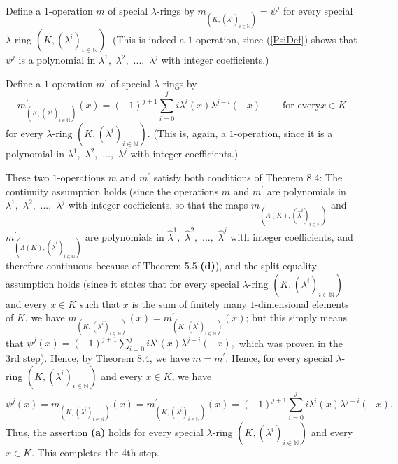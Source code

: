 \documentclass[numbers=enddot,12pt,final,onecolumn,notitlepage]{scrartcl}%
\begin{document}
Define a $1$-operation $m$ of special $\lambda$-rings by $m_{\left(  K,\left(
\lambda^{i}\right)  _{i\in\mathbb{N}}\right)  }=\psi^{j}$ for every special
$\lambda$-ring $\left(  K,\left(  \lambda^{i}\right)  _{i\in\mathbb{N}%
}\right)  $. (This is indeed a $1$-operation, since (\ref{PsiDef}) shows that
$\psi^{j}$ is a polynomial in $\lambda^{1},$ $\lambda^{2},$ $...,$
$\lambda^{j}$ with integer coefficients.)

Define a $1$-operation $m^{\prime}$ of special $\lambda$-rings by%
\[
m_{\left(  K,\left(  \lambda^{i}\right)  _{i\in\mathbb{N}}\right)  }^{\prime
}\left(  x\right)  =\left(  -1\right)  ^{j+1}\sum_{i=0}^{j}i\lambda^{i}\left(
x\right)  \lambda^{j-i}\left(  -x\right)  \ \ \ \ \ \ \ \ \ \ \text{for every
}x\in K
\]
for every $\lambda$-ring $\left(  K,\left(  \lambda^{i}\right)  _{i\in
\mathbb{N}}\right)  $. (This is, again, a $1$-operation, since it is a
polynomial in $\lambda^{1},$ $\lambda^{2},$ $...,$ $\lambda^{j}$ with integer coefficients.)

These two $1$-operations $m$ and $m^{\prime}$ satisfy both conditions of
Theorem 8.4: The continuity assumption holds (since the operations $m$ and
$m^{\prime}$ are polynomials in $\lambda^{1},$ $\lambda^{2},$ $...,$
$\lambda^{j}$ with integer coefficients, so that the maps $m_{\left(
\Lambda\left(  K\right)  ,\left(  \widehat{\lambda}^{i}\right)  _{i\in
\mathbb{N}}\right)  }$ and $m_{\left(  \Lambda\left(  K\right)  ,\left(
\widehat{\lambda}^{i}\right)  _{i\in\mathbb{N}}\right)  }^{\prime}$ are
polynomials in $\widehat{\lambda}^{1},$ $\widehat{\lambda}^{2},$ $...,$
$\widehat{\lambda}^{j}$ with integer coefficients, and therefore continuous
because of Theorem 5.5 \textbf{(d)}), and the split equality assumption holds
(since it states that for every special $\lambda$-ring $\left(  K,\left(
\lambda^{i}\right)  _{i\in\mathbb{N}}\right)  $ and every $x\in K$ such that
$x$ is the sum of finitely many $1$-dimensional elements of $K$, we have
$m_{\left(  K,\left(  \lambda^{i}\right)  _{i\in\mathbb{N}}\right)  }\left(
x\right)  =m_{\left(  K,\left(  \lambda^{i}\right)  _{i\in\mathbb{N}}\right)
}^{\prime}\left(  x\right)  $; but this simply means that $\psi^{j}\left(
x\right)  =\left(  -1\right)  ^{j+1}\sum\limits_{i=0}^{j}i\lambda^{i}\left(
x\right)  \lambda^{j-i}\left(  -x\right)  ,$ which was proven in the 3rd
step). Hence, by Theorem 8.4, we have $m=m^{\prime}$. Hence, for every special
$\lambda$-ring $\left(  K,\left(  \lambda^{i}\right)  _{i\in\mathbb{N}%
}\right)  $ and every $x\in K$, we have%
\[
\psi^{j}\left(  x\right)  =m_{\left(  K,\left(  \lambda^{i}\right)
_{i\in\mathbb{N}}\right)  }\left(  x\right)  =m_{\left(  K,\left(  \lambda
^{i}\right)  _{i\in\mathbb{N}}\right)  }^{\prime}\left(  x\right)  =\left(
-1\right)  ^{j+1}\sum_{i=0}^{j}i\lambda^{i}\left(  x\right)  \lambda
^{j-i}\left(  -x\right)  .
\]
Thus, the assertion \textbf{(a)} holds for every special $\lambda$-ring
$\left(  K,\left(  \lambda^{i}\right)  _{i\in\mathbb{N}}\right)  $ and every
$x\in K$. This completes the 4th step.
\end{document}
